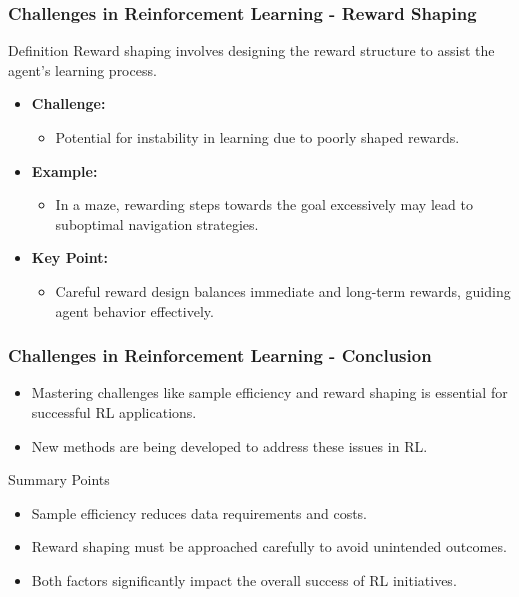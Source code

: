 \documentclass[aspectratio=169]{beamer}
\begin{document}
\begin{frame}[fragile]
    \frametitle{Challenges in Reinforcement Learning - Reward Shaping}
    \begin{block}{Definition}
        Reward shaping involves designing the reward structure to assist the agent's learning process.
    \end{block}
    \begin{itemize}
        \item \textbf{Challenge:}
        \begin{itemize}
            \item Potential for instability in learning due to poorly shaped rewards.
        \end{itemize}
        \item \textbf{Example:}
        \begin{itemize}
            \item In a maze, rewarding steps towards the goal excessively may lead to suboptimal navigation strategies.
        \end{itemize}
        \item \textbf{Key Point:} 
        \begin{itemize}
            \item Careful reward design balances immediate and long-term rewards, guiding agent behavior effectively.
        \end{itemize}
    \end{itemize}
\end{frame}

\begin{frame}[fragile]
    \frametitle{Challenges in Reinforcement Learning - Conclusion}
    \begin{itemize}
        \item Mastering challenges like sample efficiency and reward shaping is essential for successful RL applications.
        \item New methods are being developed to address these issues in RL.
    \end{itemize}

    \begin{block}{Summary Points}
        \begin{itemize}
            \item Sample efficiency reduces data requirements and costs.
            \item Reward shaping must be approached carefully to avoid unintended outcomes.
            \item Both factors significantly impact the overall success of RL initiatives.
        \end{itemize}
    \end{block}
\end{frame}
\end{document}
